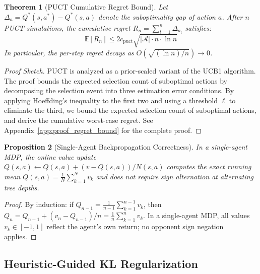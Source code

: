 \documentclass{article}
\newtheorem{theorem}{Theorem}[section]
\newtheorem{proposition}[theorem]{Proposition}
\begin{document}
\begin{theorem}[PUCT Cumulative Regret Bound]\label{thm:regret_bound}
Let $\Delta_a = Q^*(s, a^*) - Q^*(s, a)$ denote the suboptimality gap of action $a$. After $n$ PUCT simulations, the cumulative regret $R_n = \sum_{t=1}^n \Delta_{a_t}$ satisfies:
\begin{equation}
    \mathbb{E}[R_n] \leq 2c_{\mathrm{puct}} \sqrt{|\mathcal{A}| \cdot n \cdot \ln n}
\end{equation}
In particular, the per-step regret decays as $O(\sqrt{(\ln n)/n}) \to 0$.
\end{theorem}

\begin{proof}[Proof Sketch]
PUCT is analyzed as a prior-scaled variant of the UCB1 algorithm. The proof bounds the expected selection count of suboptimal actions by decomposing the selection event into three estimation error conditions. By applying Hoeffding's inequality to the first two and using a threshold $\ell$ to eliminate the third, we bound the expected selection count of suboptimal actions, and derive the cumulative worst-case regret. See Appendix~\ref{app:proof_regret_bound} for the complete proof.
\end{proof}

\begin{proposition}[Single-Agent Backpropagation Correctness]\label{prop:backprop}
In a single-agent MDP, the online value update
$Q(s, a) \leftarrow Q(s, a) + (v - Q(s,a))/N(s,a)$
computes the exact running mean $Q(s,a) = \frac{1}{N}\sum_{k=1}^N v_k$ and does not require sign alternation at alternating tree depths.
\end{proposition}

\begin{proof}
By induction: if $Q_{n-1} = \frac{1}{n-1}\sum_{k=1}^{n-1} v_k$, then $Q_n = Q_{n-1} + (v_n - Q_{n-1})/n = \frac{1}{n}\sum_{k=1}^n v_k$. In a single-agent MDP, all values $v_k \in [-1,1]$ reflect the agent's own return; no opponent sign negation applies.
\end{proof}

\subsection{Heuristic-Guided KL Regularization}
\end{document}

